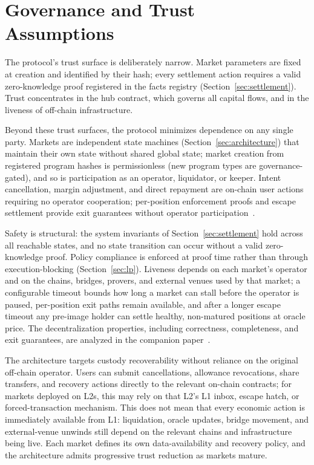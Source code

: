 \section{Governance and Trust Assumptions}
\label{sec:governance}

The protocol's trust surface is deliberately narrow. Market parameters are fixed at creation and identified by their hash; every settlement action requires a valid zero-knowledge proof registered in the facts registry (Section~\ref{sec:settlement}). Trust concentrates in the hub contract, which governs all capital flows, and in the liveness of off-chain infrastructure.

Beyond these trust surfaces, the protocol minimizes dependence on any single party. Markets are independent state machines (Section~\ref{sec:architecture}) that maintain their own state without shared global state; market creation from registered program hashes is permissionless (new program types are governance-gated), and so is participation as an operator, liquidator, or keeper. Intent cancellation, margin adjustment, and direct repayment are on-chain user actions requiring no operator cooperation; per-position enforcement proofs and escape settlement provide exit guarantees without operator participation~\cite{daloc-decent2026}.

Safety is structural: the system invariants of Section~\ref{sec:settlement} hold across all reachable states, and no state transition can occur without a valid zero-knowledge proof. Policy compliance is enforced at proof time rather than through execution-blocking (Section~\ref{sec:lp}). Liveness depends on each market's operator and on the chains, bridges, provers, and external venues used by that market; a configurable timeout bounds how long a market can stall before the operator is paused, per-position exit paths remain available, and after a longer escape timeout any pre-image holder can settle healthy, non-matured positions at oracle price. The decentralization properties, including correctness, completeness, and exit guarantees, are analyzed in the companion paper~\cite{daloc-decent2026}.

The architecture targets custody recoverability without reliance on the original off-chain operator. Users can submit cancellations, allowance revocations, share transfers, and recovery actions directly to the relevant on-chain contracts; for markets deployed on L2s, this may rely on that L2's L1 inbox, escape hatch, or forced-transaction mechanism. This does not mean that every economic action is immediately available from L1: liquidation, oracle updates, bridge movement, and external-venue unwinds still depend on the relevant chains and infrastructure being live. Each market defines its own data-availability and recovery policy, and the architecture admits progressive trust reduction as markets mature.

